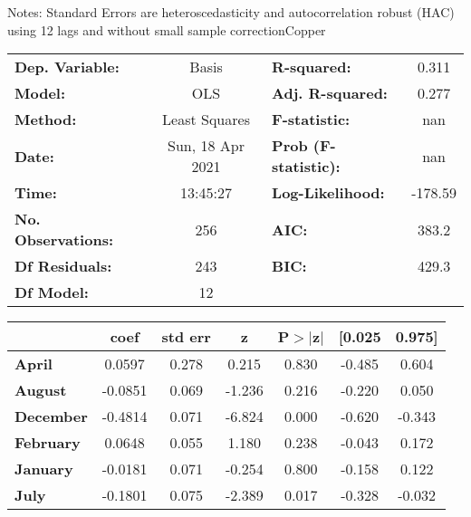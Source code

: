 Notes: \newline
 [1] Standard Errors are heteroscedasticity and autocorrelation robust (HAC) using 12 lags and without small sample correctionCopper\begin{center}
\begin{tabular}{lclc}
\toprule
\textbf{Dep. Variable:}    &      Basis       & \textbf{  R-squared:         } &     0.311   \\
\textbf{Model:}            &       OLS        & \textbf{  Adj. R-squared:    } &     0.277   \\
\textbf{Method:}           &  Least Squares   & \textbf{  F-statistic:       } &       nan   \\
\textbf{Date:}             & Sun, 18 Apr 2021 & \textbf{  Prob (F-statistic):} &      nan    \\
\textbf{Time:}             &     13:45:27     & \textbf{  Log-Likelihood:    } &   -178.59   \\
\textbf{No. Observations:} &         256      & \textbf{  AIC:               } &     383.2   \\
\textbf{Df Residuals:}     &         243      & \textbf{  BIC:               } &     429.3   \\
\textbf{Df Model:}         &          12      & \textbf{                     } &             \\
\bottomrule
\end{tabular}
\begin{tabular}{lcccccc}
                   & \textbf{coef} & \textbf{std err} & \textbf{z} & \textbf{P$> |$z$|$} & \textbf{[0.025} & \textbf{0.975]}  \\
\midrule
\textbf{April}     &       0.0597  &        0.278     &     0.215  &         0.830        &       -0.485    &        0.604     \\
\textbf{August}    &      -0.0851  &        0.069     &    -1.236  &         0.216        &       -0.220    &        0.050     \\
\textbf{December}  &      -0.4814  &        0.071     &    -6.824  &         0.000        &       -0.620    &       -0.343     \\
\textbf{February}  &       0.0648  &        0.055     &     1.180  &         0.238        &       -0.043    &        0.172     \\
\textbf{January}   &      -0.0181  &        0.071     &    -0.254  &         0.800        &       -0.158    &        0.122     \\
\textbf{July}      &      -0.1801  &        0.075     &    -2.389  &         0.017        &       -0.328    &       -0.032     \\

\end{tabular}
\end{center}
